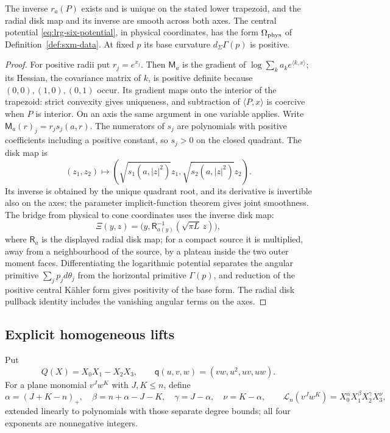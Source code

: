 \begin{lemma}\label{lem:sxm-weights}
The inverse $r_a(P)$ exists and is unique on the stated lower trapezoid, and the
radial disk map and its inverse are smooth across both axes. The central potential
\eqref{eq:lrg-six-potential}, in physical coordinates, has the form $\Omega_{\rm phys}$ of
Definition~\ref{def:sxm-data}. At fixed $p$ its base curvature $d_\Sigma\Gamma(p)$ is positive.
\end{lemma}

\begin{proof}
For positive radii put $r_j=e^{x_j}$. Then $\mathsf M_a$ is the gradient of
$\log\sum_k a_ke^{\langle k,x\rangle}$; its Hessian, the covariance matrix of $k$, is positive definite because
$(0,0),(1,0),(0,1)$ occur. Its gradient maps onto the interior of the trapezoid:
strict convexity gives uniqueness, and subtraction of $\langle P,x\rangle$ is
coercive when $P$ is interior. On an axis the same argument in one variable applies.
Write $\mathsf M_a(r)_j=r_j s_j(a,r)$. The numerators of $s_j$ are polynomials with
positive coefficients including a positive constant, so $s_j>0$ on the closed quadrant. The disk map is
\[
 (z_1,z_2)\longmapsto(\sqrt{s_1(a,|z|^2)}z_1,
                            \sqrt{s_2(a,|z|^2)}z_2).
\]
Its inverse is obtained by the unique quadrant root, and its derivative is invertible
also on the axes; the parameter implicit-function theorem gives joint smoothness.
The bridge from physical to cone coordinates uses the inverse disk map:
\[
 \Xi(y,z)=\bigl(y,\mathsf R_{a(y)}^{-1}(\sqrt{\pi L}\,z)\bigr),
\]
where $\mathsf R_a$ is the displayed radial disk map; for a compact source it is multiplied,
away from a neighbourhood of the source, by a plateau inside the two outer moment faces. Differentiating the
logarithmic potential separates the angular primitive $\sum_j p_jd\theta_j$ from the horizontal
primitive $\Gamma(p)$, and reduction of the positive central Kähler form gives positivity of the
base form. The radial disk pullback identity includes the vanishing angular terms on the axes.
\end{proof}

\subsection{Explicit homogeneous lifts}\label{sec:sxm-lift}

Put
\[
 Q(X)=X_0X_1-X_2X_3,\qquad \mathsf q(u,v,w)=(vw,u^2,uv,uw).
\]
For a plane monomial $v^Jw^K$ with $J,K\le n$, define
\[
 \alpha=(J+K-n)_+,\quad \beta=n+\alpha-J-K,\quad
 \gamma=J-\alpha,\quad \nu=K-\alpha,
 \qquad \mathcal L_n(v^Jw^K)=X_0^\alpha X_1^\beta X_2^\gamma X_3^\nu,
\]
extended linearly to polynomials with those separate degree bounds; all four
exponents are nonnegative integers.

